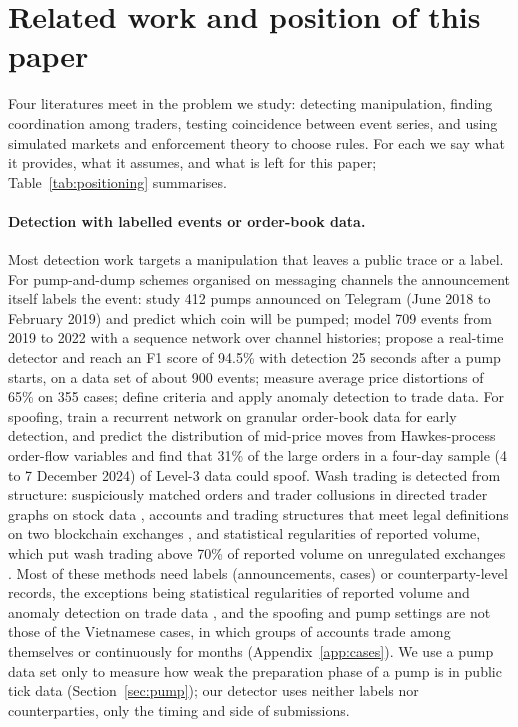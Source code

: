 \section{Related work and position of this paper}\label{sec:related}

Four literatures meet in the problem we study: detecting manipulation, finding coordination among traders, testing coincidence between event series, and using simulated markets and enforcement theory to choose rules. For each we say what it provides, what it assumes, and what is left for this paper; Table~\ref{tab:positioning} summarises.

\paragraph{Detection with labelled events or order-book data.} Most detection work targets a manipulation that leaves a public trace or a label. For pump-and-dump schemes organised on messaging channels the announcement itself labels the event: \citet{xu2019} study 412 pumps announced on Telegram (June 2018 to February 2019) and predict which coin will be pumped; \citet{hu2022} model 709 events from 2019 to 2022 with a sequence network over channel histories; \citet{lamorgia2020} propose a real-time detector and \citet{lamorgia2023} reach an F1 score of 94.5\% with detection 25 seconds after a pump starts, on a data set of about 900 events; \citet{dhawan2023} measure average price distortions of 65\% on 355 cases; \citet{kamps2018} define criteria and apply anomaly detection to trade data. For spoofing, \citet{tuccella2021} train a recurrent network on granular order-book data for early detection, and \citet{fabre2025} predict the distribution of mid-price moves from Hawkes-process order-flow variables and find that 31\% of the large orders in a four-day sample (4 to 7 December 2024) of Level-3 data could spoof. Wash trading is detected from structure: suspiciously matched orders and trader collusions in directed trader graphs on stock data \citep{cao2016}, accounts and trading structures that meet legal definitions on two blockchain exchanges \citep{victor2021}, and statistical regularities of reported volume, which put wash trading above 70\% of reported volume on unregulated exchanges \citep{cong2023}. Most of these methods need labels (announcements, cases) or counterparty-level records, the exceptions being statistical regularities of reported volume \citep{cong2023} and anomaly detection on trade data \citep{kamps2018}, and the spoofing and pump settings are not those of the Vietnamese cases, in which groups of accounts trade among themselves or continuously for months (Appendix~\ref{app:cases}). We use a pump data set only to measure how weak the preparation phase of a pump is in public tick data (Section~\ref{sec:pump}); our detector uses neither labels nor counterparties, only the timing and side of submissions.

